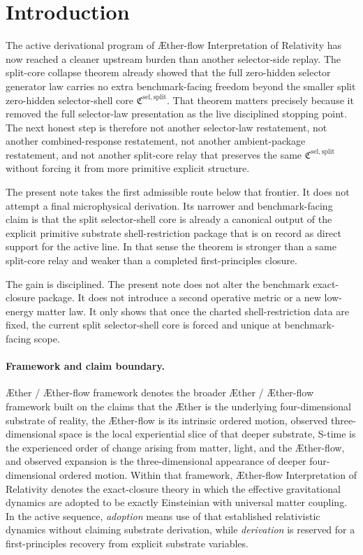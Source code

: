 \documentclass[11pt]{article}
\newcommand{\Aether}{\AE{}ther}
\newcommand{\Aflow}{\AE{}ther-flow}
\newcommand{\TheoryName}{\Aflow{} Interpretation of Relativity}
\newcommand{\TheoryProgram}{\Aether{} / \Aflow{} framework}
\newcommand{\SelectorCore}{\mathfrak C^{\mathrm{sel,split}}}
\begin{document}
\section{Introduction}

The active derivational program of \TheoryName{} has now reached a cleaner upstream burden than another selector-side replay. The split-core collapse theorem already showed that the full zero-hidden selector generator law carries no extra benchmark-facing freedom beyond the smaller split zero-hidden selector-shell core \(\SelectorCore\). That theorem matters precisely because it removed the full selector-law presentation as the live disciplined stopping point. The next honest step is therefore not another selector-law restatement, not another combined-response restatement, not another ambient-package restatement, and not another split-core relay that preserves the same \(\SelectorCore\) without forcing it from more primitive explicit structure.

The present note takes the first admissible route below that frontier. It does not attempt a final microphysical derivation. Its narrower and benchmark-facing claim is that the split selector-shell core is already a canonical output of the explicit primitive substrate shell-restriction package that is on record as direct support for the active line. In that sense the theorem is stronger than a same split-core relay and weaker than a completed first-principles closure.

The gain is disciplined. The present note does not alter the benchmark exact-closure package. It does not introduce a second operative metric or a new low-energy matter law. It only shows that once the charted shell-restriction data are fixed, the current split selector-shell core is forced and unique at benchmark-facing scope.

\paragraph{Framework and claim boundary.}
\TheoryProgram{} denotes the broader \Aether{} / \Aflow{} framework built on the claims that the \Aether{} is the underlying four-dimensional substrate of reality, the \Aflow{} is its intrinsic ordered motion, observed three-dimensional space is the local experiential slice of that deeper substrate, S-time is the experienced order of change arising from matter, light, and the \Aflow{}, and observed expansion is the three-dimensional appearance of deeper four-dimensional ordered motion. Within that framework, \TheoryName{} denotes the exact-closure theory in which the effective gravitational dynamics are adopted to be exactly Einsteinian with universal matter coupling. In the active sequence, \emph{adoption} means use of that established relativistic dynamics without claiming substrate derivation, while \emph{derivation} is reserved for a first-principles recovery from explicit substrate variables.
\end{document}
